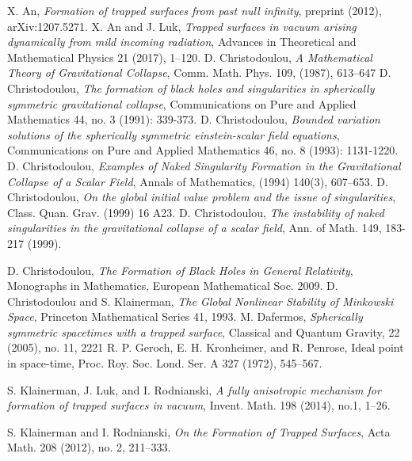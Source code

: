 \documentclass[11pt,reqno]{amsart}
\theoremstyle{definition}
\numberwithin{equation}{section}
\begin{document}
\begin{thebibliography}{99}
 X. An, \textit{Formation of trapped surfaces from past null infinity}, preprint (2012), arXiv:1207.5271.
 X. An and J. Luk, \textit{Trapped surfaces in vacuum arising dynamically from mild incoming radiation}, Advances in Theoretical and Mathematical Physics 21 (2017), 1--120.
 D. Christodoulou, \textit{A Mathematical Theory of Gravitational Collapse}, Comm. Math. Phys. 109, (1987), 613--647
 D. Christodoulou, \textit{The formation of black holes and singularities in spherically symmetric gravitational collapse}, Communications on Pure and Applied Mathematics 44, no. 3 (1991): 339-373.
 D. Christodoulou, \textit{Bounded variation solutions of the spherically symmetric einstein-scalar field equations}, Communications on Pure and Applied Mathematics 46, no. 8 (1993): 1131-1220.
 D. Christodoulou, \textit{Examples of Naked Singularity Formation in the Gravitational Collapse of a Scalar Field}, Annals of Mathematics, (1994) 140(3), 607--653.
 D. Christodoulou, \textit{On the global initial value problem and the issue of singularities}, Class. Quan. Grav. (1999)  16 A23.
 D. Christodoulou, \textit{The instability of naked singularities in the gravitational collapse of a scalar field}, Ann. of Math. 149, 183-217 (1999).

 D. Christodoulou, \textit{The Formation of Black Holes in General Relativity}, Monographs in Mathematics, European Mathematical Soc. 2009.
 D. Christodoulou and S. Klainerman, \textit{The Global Nonlinear Stability of Minkowski Space}, Princeton Mathematical Series 41, 1993.
 M. Dafermos, \textit{Spherically symmetric spacetimes with a trapped surface}, Classical and Quantum Gravity, 22 (2005), no. 11, 2221
 R. P. Geroch, E. H. Kronheimer, and R. Penrose, Ideal point in space-time, Proc. Roy. Soc. Lond. Ser. A 327 (1972), 545--567.

 S. Klainerman, J. Luk, and I. Rodnianski, \textit{A fully anisotropic mechanism for formation of trapped surfaces in vacuum}, Invent. Math. 198 (2014), no.1, 1--26.

 S. Klainerman and I. Rodnianski, \textit{On the Formation of Trapped Surfaces}, Acta Math. 208 (2012), no. 2, 211--333.


\end{thebibliography}
\end{document}
